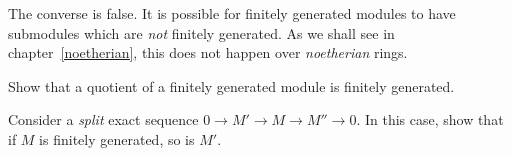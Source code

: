 The converse is false. It is possible for finitely generated modules to have
submodules which are \emph{not} finitely generated. As we shall see in
chapter~\ref{noetherian}, this does not happen over \emph{noetherian} rings.


\begin{exercise} 
Show that a quotient of a finitely generated module is finitely generated.
\end{exercise}

\begin{example} 
Consider a \emph{split} exact sequence $0 \to M' \to M \to M'' \to 0$. In this
case, show that if $M$ is finitely generated, so is $M'$.
\end{example} 

